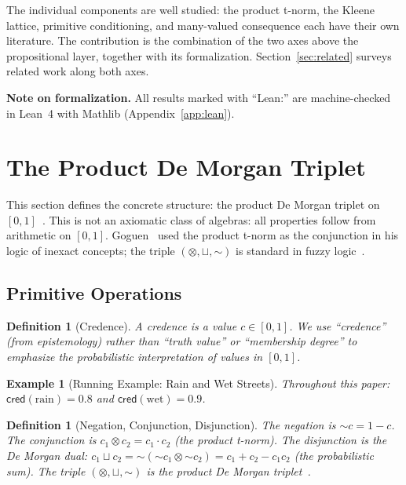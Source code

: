 \documentclass[11pt,a4paper]{article}
\newtheorem{definition}[theorem]{Definition}
\newtheorem{example}[theorem]{Example}
\newcommand{\cred}{\mathsf{cred}}
\newcommand{\negc}{\mathord{\sim}}
\newcommand{\conjc}{\otimes}
\newcommand{\disjc}{\sqcup}
\begin{document}
The individual components are well studied: the product t-norm,
the Kleene lattice, primitive conditioning, and many-valued
consequence each have their own literature.
The contribution is the combination of the two axes above the
propositional layer, together with its formalization.
Section~\ref{sec:related} surveys related work along both axes.

\textbf{Note on formalization.}
All results marked with ``Lean:'' are machine-checked in Lean~4
with Mathlib (Appendix~\ref{app:lean}).

\section{The Product De Morgan Triplet}
\label{sec:triplet}

This section defines the concrete structure: the product De Morgan
triplet on $[0,1]$~\cite{klement2000,hajek1998,esteva2000}.
This is not an axiomatic class of algebras: all properties follow
from arithmetic on $[0,1]$.
Goguen~\cite{goguen1969} used the product t-norm as the conjunction
in his logic of inexact concepts;
the triple $(\conjc, \disjc, \negc)$ is standard in fuzzy
logic~\cite{bergmann2008,cintula2011}.

\subsection{Primitive Operations}

\begin{definition}[Credence]
\label{def:credence}
A \emph{credence} is a value $c \in [0,1]$.
We use ``credence'' (from epistemology) rather than ``truth value''
or ``membership degree'' to emphasize the probabilistic
interpretation of values in $[0,1]$.
\end{definition}

\begin{example}[Running Example: Rain and Wet Streets]
\label{ex:rain}
Throughout this paper:
$\cred(\text{rain}) = 0.8$ and $\cred(\text{wet}) = 0.9$.
\end{example}

\begin{definition}[Negation, Conjunction, Disjunction]
\label{def:operations}
The \emph{negation} is $\negc c = 1 - c$.
The \emph{conjunction} is $c_1 \conjc c_2 = c_1 \cdot c_2$
(the product t-norm).
The \emph{disjunction} is the De Morgan dual:
$c_1 \disjc c_2 = \negc(\negc c_1 \conjc \negc c_2)
  = c_1 + c_2 - c_1 c_2$
(the probabilistic sum).
The triple $(\conjc, \disjc, \negc)$ is the
\emph{product De Morgan triplet}~\cite{klement2000,hajek1998}.
\end{definition}
\end{document}
